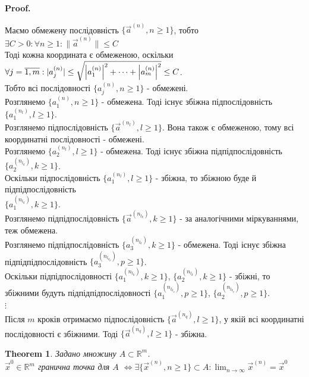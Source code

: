 \documentclass[a4paper, 10pt]{article}
\makeatletter
\def\huge{\displaystyle}
\def\qed{$\blacksquare$}
\theoremstyle{theoremdd}
\newtheorem{theorem}{Theorem}[subsection]
\theoremstyle{theoremdd}
\theoremstyle{theoremdd}
\theoremstyle{theoremdd}
\theoremstyle{theoremdd}
\theoremstyle{theoremdd}
\theoremstyle{theoremdd}
\theoremstyle{theoremdd}
\renewenvironment{proof}[1][Proof.\\]{\par
\pushQED{\hfill \qed}%
\normalfont \topsep6\p@\@plus6\p@\relax
\trivlist
\item\relax
{\bfseries
#1\@addpunct{.}}\hspace\labelsep\ignorespaces
}{%
\popQED\endtrivlist\@endpefalse
}
\newcommand\Norm[1]{\lVert#1\rVert}
\makeatother
\begin{document}
\begin{proof}
Маємо обмежену послідовність $\{\vec{a}^{(n)}, n \geq 1\}$, тобто $\exists C > 0: \forall n \geq 1: \Norm{\vec{a}^{(n)}} \leq C$\\
Тоді кожна координата є обмеженою, оскільки $\forall j = \overline{1,m}: |a_j^{(n)}| \leq \sqrt{\abs{a_1^{(n)}}^2 + \dots + \abs{a_m^{(n)}}^2} \leq C$.\\
Тобто всі послідовності $\{a_j^{(n)}, n \geq 1\}$ - обмежені.\\
Розглянемо $\{a_1^{(n)}, n \geq 1\}$ - обмежена. Тоді існує збіжна підпослідовність $\{a_1^{(n_l)}, l \geq 1\}$.\\
Розглянемо підпослідовність $\{\vec{a}^{(n_l)}, l \geq 1\}$. Вона також є обмеженою, тому всі координатні послідовності - обмежені.\\
Розглянемо $\{a_2^{(n_l)}, l \geq 1\}$ - обмежена. Тоді існує збіжна підпідпослідовність $\{a_2^{(n_{l_k})}, k \geq 1 \}$.\\
Оскільки підпослідовність $\{a_1^{(n_l)}, l \geq 1 \}$ - збіжна, то збіжною буде й підпідпослідовність \\ $\{a_1^{(n_{l_k})}, k \geq 1 \}$.\\
Розглянемо підпідпослідовність $\{\vec{a}^{(n_{l_k})}, k \geq 1\}$ - за аналогічними міркуваннями, теж обмежена.\\
Розглянемо підпідпослідовність $\{a_3^{(n_{l_k})}, k \geq 1 \}$ - обмежена. Тоді існує збіжна підпідпідпослідовність $\{a_3^{(n_{l_{k_p}})}, p \geq 1 \}$.\\
Оскільки підпідпослідовності $\{a_1^{(n_{l_k})}, k \geq 1 \}$, $\{a_2^{(n_{l_k})}, k \geq 1 \}$ - збіжні, то збіжними будуть підпідпідпослідовності  $\{a_1^{(n_{l_{k_p}})}, p \geq 1 \}$, $\{a_2^{(n_{l_{k_p}})}, p \geq 1 \}$.\\
$\vdots$
\\
Після $m$ кроків отримаємо підпослідовність $\{\vec{a}^{(n_q)}, l \geq 1\}$, у якій всі координатні послідовності є збіжними. Тоді $\{\vec{a}^{(n_q)}, l \geq 1\}$ - збіжна.
\end{proof}

\begin{theorem}
Задано множину $A \subset \mathbb{R}^m$.\\
$\vec{x}^0 \in \mathbb{R}^m$ гранична точка для $A$ $\iff \exists \{\vec{x}^{(n)}, n \geq 1\} \subset A: \huge \lim_{n \to \infty} \vec{x}^{(n)} = \vec{x}^0$\\
\end{theorem}
\end{document}
